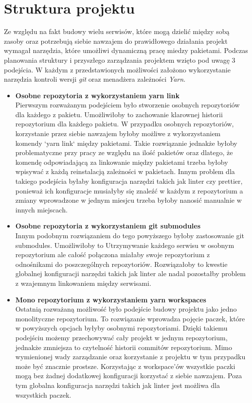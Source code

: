 \section{Struktura projektu}
Ze względu na fakt budowy wielu serwisów, które mogą dzielić między sobą zasoby oraz potrzebują siebie nawzajem do prawidłowego działania projekt wymagał narzędzia, które umożliwi dynamiczną pracę miedzy pakietami. Podczas planowania struktury i przyszłego zarządzania projektem wzięto pod uwagę 3 podejścia. W każdym z przedstawionych możliwości założono wykorzystanie narzędzia kontroli wersji \textit{git} oraz menadżera zależności \textit{Yarn}.

\begin{itemize}
    \item \textbf {Osobne repozytoria z wykorzystaniem yarn link} \\
        Pierwszym rozważanym podejściem było stworzenie osobnych repozytoriów dla każdego z pakietu.
        Umożliwiłoby to zachowanie klarownej historii repozytorium dla każdego pakietu. W przypadku osobnych repozytoriów, korzystanie przez siebie nawzajem byłoby możliwe z wykorzystaniem komendy `yarn link` między pakietami. Takie rozwiązanie jednakże byłoby problematyczne przy pracy ze względu na ilość pakietów oraz dlatego, że komendę odpowiadającą za linkowanie między pakietami trzeba byłoby wpisywać z każdą reinstalacją zależności w pakietach. Innym problem dla takiego podejścia byłaby konfiguracja narzędzi takich jak linter czy prettier, ponieważ ich konfiguracje musiałyby się znaleźć w każdym z repozytorium a zmiany wprowadzone w jednym miesjcu trzeba byłoby nanosić manualnie w innych miejscach. \cite{YarnLinkDocs}

    \item \textbf {Osobne repozytoria z wykorzystaniem git submodules} \\
        Innym podobnym rozwiązaniem do tego powyższego byłoby zastosowanie git submodules. Umożliwiłoby to Utrzymywanie każdego serwisu w osobnym repozytorium ale całość połączona miałaby swoje repozytorium z odnośnikami do poszczególnych repozytoriów. Rozwiązałoby to kwestie globalnej konfiguracji narzędzi takich jak linter ale nadal pozostałby problem z wzajemnym linkowaniem między serwisami. \cite{GitSubmodulesDocs}

    \item \textbf {Mono repozytorium z wykorzystaniem yarn workspaces} \\
        Ostatnią rozważaną możliwość było podejście budowy projektu jako jedno monolityczne repozytorium. To rozwiązanie wprowadza pojęcie paczek, które w powyższych opcjach byłyby osobnymi repozytoriami. Dzięki takiemu podejściu możemy przechowywać cały projekt w jednym repozytorium, jednakże zmniejsza to czytelność historii commitów repozytorium. Mimo wymienionej wady zarządzanie oraz korzystanie z projektu w tym przypadku może być znacznie prostsze. Korzystając z workspace'ów wszystkie paczki mogą bez żadnej dodatkowej konfiguracji korzystać z siebie nawzajem. Poza tym globalna konfiguracja narzędzi takich jak linter jest możliwa dla wszystkich paczek. \cite{YarnWorkspacesDocs}

\end{itemize}


